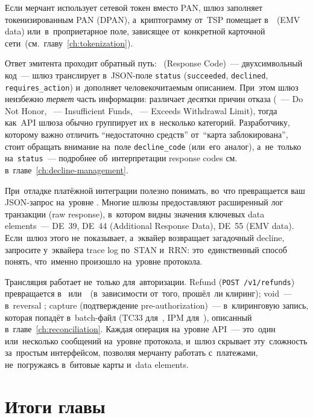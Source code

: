 Если мерчант использует сетевой токен вместо PAN, шлюз заполняет
 токенизированным PAN (DPAN), а~криптограмму от~TSP
помещает в~~(EMV data) или~в~проприетарное поле,
зависящее от~конкретной карточной
сети~(см.~главу~\ref{ch:tokenization}).

Ответ эмитента проходит обратный путь: ~(Response Code)~---
двухсимвольный код~--- шлюз транслирует в~JSON-поле
\texttt{status} (\texttt{succeeded}, \texttt{declined},
\texttt{requires\_action}) и~дополняет человекочитаемым
описанием. При~этом шлюз неизбежно \emph{теряет} часть
информации:  различает десятки причин отказа (~---
Do Not Honor, ~--- Insufficient Funds, ~--- Exceeds
Withdrawal Limit), тогда как~API шлюза обычно группирует их
в~несколько категорий. Разработчику, которому важно отличить
\enquote{недостаточно средств} от~\enquote{карта заблокирована},
стоит обращать внимание на~поле \texttt{decline\_code}
(или~его~аналог), а~не~только на~\texttt{status}~---
подробнее об~интерпретации response codes см.
в~главе~\ref{ch:decline-management}.

\begin{practice}
  При~отладке платёжной интеграции полезно понимать, во~что
  превращается ваш JSON-запрос на~уровне . Многие
  шлюзы предоставляют расширенный лог транзакции (raw response),
  в~котором видны значения ключевых data elements~--- DE~39,
  DE~44 (Additional Response Data), DE~55 (EMV data). Если~шлюз
  этого не~показывает, а~эквайер возвращает загадочный decline,
  запросите у~эквайера trace log по~STAN и~RRN: это~единственный
  способ понять, что~именно произошло на~уровне протокола.
\end{practice}

Трансляция работает не~только для~авторизации. Refund
(\texttt{POST~/{v1}/{refunds}}) превращается в~
или~~(в~зависимости от~того, прошёл~ли клиринг);
void~--- в~reversal ; capture (подтверждение
pre-authorization)~--- в~клиринговую запись, которая попадёт
в~batch-файл (TC33 для~, IPM
для~), описанный
в~главе~\ref{ch:reconciliation}. Каждая операция на~уровне
API~--- это~один или~несколько сообщений на~уровне протокола,
и~шлюз скрывает эту~сложность за~простым интерфейсом, позволяя
мерчанту работать с~платежами, не~погружаясь в~битовые карты
и~data elements.


\section*{Итоги главы}

